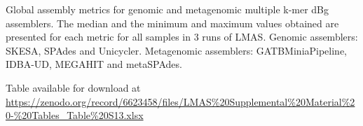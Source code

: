\begin{table}[]
\centering
\caption{Global assembly metrics for genomic and metagenomic multiple k-mer dBg assemblers. The median and the minimum and maximum values obtained are presented for each metric for all samples in 3 runs of LMAS. Genomic assemblers: SKESA, SPAdes and Unicycler. Metagenomic assemblers: GATBMiniaPipeline, IDBA-UD, MEGAHIT and metaSPAdes.}
\label{tab:ch5_suptable13}
Table available for download at \url{https://zenodo.org/record/6623458/files/LMAS\%20Supplemental\%20Material\%20-\%20Tables_Table\%20S13.xlsx}
\end{table}